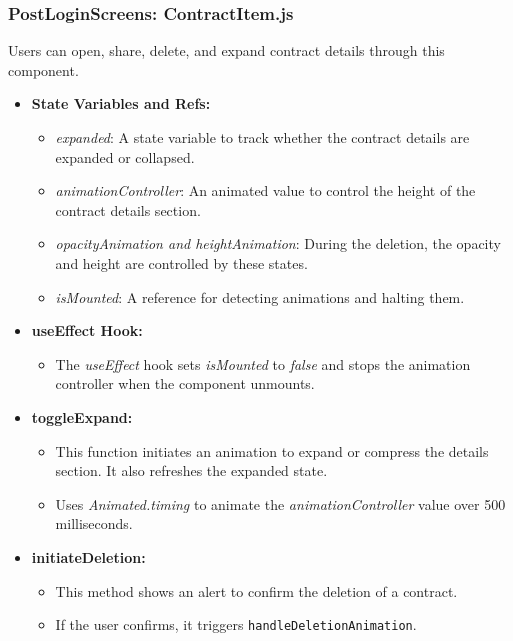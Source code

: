 \subsubsection{PostLoginScreens: ContractItem.js}

Users can open, share, delete, and expand contract details through this component. 

\begin{itemize}
    \item \textbf{State Variables and Refs:}
    \begin{itemize}
        \item \textit{expanded}: A state variable to track whether the contract details are expanded or collapsed.
        \item \textit{animationController}: An animated value to control the height of the contract details section.
        \item \textit{opacityAnimation and heightAnimation}: During the deletion, the opacity and height are controlled by these states.
        \item \textit{isMounted}: A reference for detecting animations and halting them.
    \end{itemize}

    \item \textbf{useEffect Hook:}
    \begin{itemize}
        \item The \textit{useEffect} hook sets \textit{isMounted} to \textit{false} and stops the animation controller when the component unmounts.
    \end{itemize}

    \item \textbf{toggleExpand:}
    \begin{itemize}
        \item This function initiates an animation to expand or compress the details section. It also refreshes the expanded state.
        \item Uses \textit{Animated.timing} to animate the \textit{animationController} value over 500 milliseconds.
    \end{itemize}

    \item \textbf{initiateDeletion:}
    \begin{itemize}
        \item This method shows an alert to confirm the deletion of a contract.
        \item If the user confirms, it triggers \texttt{handleDeletionAnimation}.
    \end{itemize}


\end{itemize}
